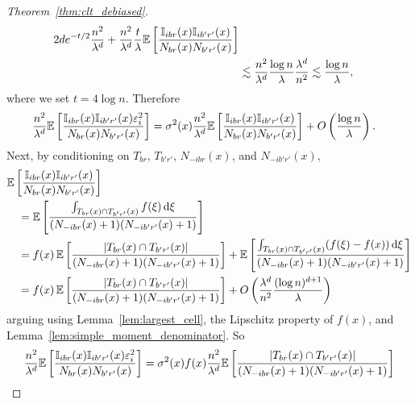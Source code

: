 \begin{proof}[Theorem~\ref{thm:clt_debiased}]
\begin{align*}
    2de^{-t/2}
    \frac{n^2}{\lambda^d}
    + \frac{n^2}{\lambda^d}
    \frac{t}{\lambda}
    \mathbb{E} \left[
      \frac{\mathbb{I}_{i b r}(x) \mathbb{I}_{i b' r'}(x)}
      {N_{b r}(x) N_{b' r'}(x)}
    \right] \\
    &\lesssim
    \frac{n^2}{\lambda^d}
    \frac{\log n}{\lambda}
    \frac{\lambda^d}{n^2}
    \lesssim
    \frac{\log n}{\lambda},
  \end{align*}
  where we set $t = 4 \log n$.
  Therefore
  \begin{align*}
    \frac{n^2}{\lambda^d}
    \mathbb{E} \left[
      \frac{\mathbb{I}_{i b r}(x) \mathbb{I}_{i b' r'}(x) \varepsilon_i^2}
      {N_{b r}(x) N_{b' r'}(x)}
    \right]
    &=
    \sigma^2(x)
    \frac{n^2}{\lambda^d}
    \mathbb{E} \left[
      \frac{\mathbb{I}_{i b r}(x) \mathbb{I}_{i b' r'}(x)}
      {N_{b r}(x) N_{b' r'}(x)}
    \right]
    + O \left( \frac{\log n}{\lambda} \right).
  \end{align*}
  Next, by conditioning on
  $T_{b r}$, $T_{b' r'}$, $N_{-i b r}(x)$, and $N_{-i b' r'}(x)$,
  \begin{align*}
    &\mathbb{E} \left[
      \frac{\mathbb{I}_{i b r}(x) \mathbb{I}_{i b' r'}(x)}
      {N_{b r}(x) N_{b' r'}(x)}
    \right] \\
    &\quad= \mathbb{E} \left[
      \frac{\int_{T_{b r}(x) \cap T_{b' r'}(x)} f(\xi) \,\mathrm{d}\xi}
      {(N_{-i b r}(x)+1) (N_{-i b' r'}(x)+1)}
    \right] \\
    &\quad= f(x) \,
    \mathbb{E} \left[
      \frac{|T_{b r}(x) \cap T_{b' r'}(x)|}
      {(N_{-i b r}(x)+1) (N_{-i b' r'}(x)+1)}
    \right]
    +
    \mathbb{E} \left[
      \frac{\int_{T_{b r}(x) \cap T_{b' r'}(x)}
      (f(\xi) - f(x)) \,\mathrm{d}\xi}
      {(N_{-i b r}(x)+1) (N_{-i b' r'}(x)+1)}
    \right] \\
    &\quad=
    f(x) \,
    \mathbb{E} \left[
      \frac{|T_{b r}(x) \cap T_{b' r'}(x)|}
      {(N_{-i b r}(x)+1) (N_{-i b' r'}(x)+1)}
    \right]
    + O \left(
      \frac{\lambda^d}{n^2}
      \frac{(\log n)^{d+1}}{\lambda}
    \right)
  \end{align*}
  arguing using Lemma~\ref{lem:largest_cell},
  the Lipschitz property of $f(x)$,
  and Lemma~\ref{lem:simple_moment_denominator}. So
  \begin{align*}
    \frac{n^2}{\lambda^d}
    \E \left[
      \frac{\I_{i b r}(x) \I_{i b' r'}(x) \varepsilon_i^2}
      {N_{b r}(x) N_{b' r'}(x)}
    \right]
    &=
    \sigma^2(x)
    f(x)
    \frac{n^2}{\lambda^d}
    \E \left[
      \frac{|T_{b r}(x) \cap T_{b' r'}(x)|}
      {(N_{-i b r}(x)+1) (N_{-i b' r'}(x)+1)}
    \right] \\

\end{align*}
\end{proof}
